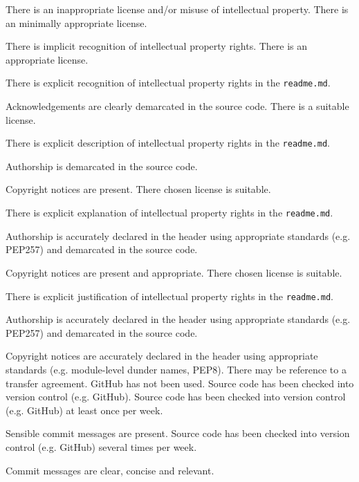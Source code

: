 \documentclass{../../fal_assignment}
\begin{document}
\begin{markingrubric}
        \grade\fail There is an inappropriate license and/or misuse of intellectual property.
        \grade There is an minimally appropriate license.
            \par There is implicit recognition of intellectual property rights.
        \grade There is an appropriate license. 
            \par There is explicit recognition of intellectual property rights in the \texttt{readme.md}.
            \par Acknowledgements are clearly demarcated in the source code.
        \grade There is a suitable license.
            \par There is explicit description of intellectual property rights in the \texttt{readme.md}.
            \par Authorship is demarcated in the source code.
            \par Copyright notices are present.
        \grade There chosen license is suitable. 
            \par There is explicit explanation of intellectual property rights in the \texttt{readme.md}.
            \par Authorship is accurately declared in the header using appropriate standards (e.g. PEP257) and demarcated in the source code.
            \par Copyright notices are present and appropriate.
        \grade There chosen license is suitable.
            \par There is explicit justification of intellectual property rights in the \texttt{readme.md}.
            \par Authorship is accurately declared in the header using appropriate standards (e.g. PEP257) and demarcated in the source code.
            \par Copyright notices are accurately declared in the header using appropriate standards (e.g. module-level dunder names, PEP8). There may be reference to a transfer agreement.
%
        \grade\fail GitHub has not been used.
        \grade Source code has been checked into version control (e.g. GitHub).
        \grade Source code has been checked into version control (e.g. GitHub) at least once per week.
            \par Sensible commit messages are present.
        \grade Source code  has been checked into version control (e.g. GitHub) several times per week.
            \par Commit messages are clear, concise and relevant.

\end{markingrubric}
\end{document}
